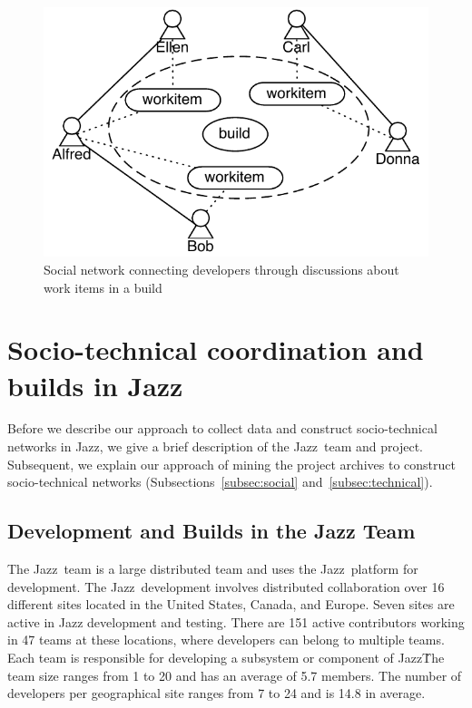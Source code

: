 \begin{figure}[t]
\centering
\includegraphics[width=.7\columnwidth]{figures/buildsn}
\caption{Social network connecting developers through discussions about
work items in a build}
\label{fig:buildsn}
\end{figure}


















\section{Socio-technical coordination and builds in Jazz}
\label{sec:data}
Before we describe our approach to collect data and construct
socio-technical networks in Jazz, we give a brief
description of the Jazz\texttrademark\ team and project. Subsequent,
we explain our approach of mining the project archives to construct
socio-technical networks (Subsections~\ref{subsec:social}
and~\ref{subsec:technical}).

\subsection{Development and Builds in the Jazz Team}
The Jazz\tm\ team is a large distributed team and uses the Jazz\tm\ platform for
development. The Jazz\tm\ development involves distributed collaboration over 16
different sites located in the United States, Canada, and Europe. Seven sites are
active in Jazz development and testing. There are 151 active contributors
working in 47 teams at these locations, where developers can belong to multiple
teams. Each team is responsible for developing a subsystem or component of Jazz\tm\.
The team size ranges from 1 to 20 and has an average of 5.7 members. The number
of developers per geographical site ranges from 7 to 24 and is 14.8 in average.

